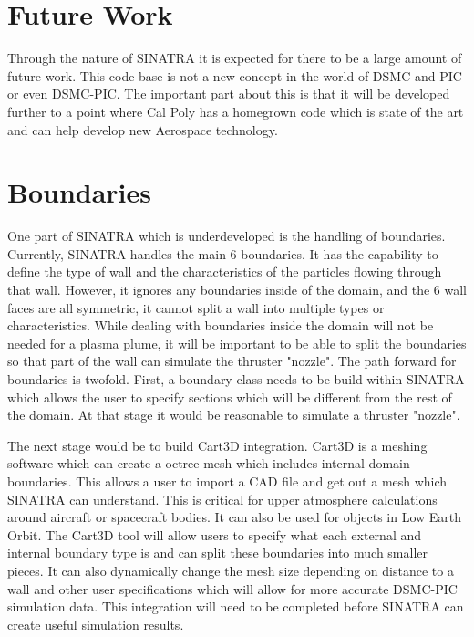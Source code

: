 \section{Future Work}

Through the nature of SINATRA it is expected for there to be a large amount of future work. This code base is not a new concept in the world of DSMC and PIC or even DSMC-PIC. The important part about this is that it will be developed further to a point where Cal Poly has a homegrown code which is state of the art and can help develop new Aerospace technology. 

\section{Boundaries}

One part of SINATRA which is underdeveloped is the handling of boundaries. Currently, SINATRA handles the main 6 boundaries. It has the capability to define the type of wall and the characteristics of the particles flowing through that wall. However, it ignores any boundaries inside of the domain, and the 6 wall faces are all symmetric, it cannot split a wall into multiple types or characteristics. While dealing with boundaries inside the domain will not be needed for a plasma plume, it will be important to be able to split the boundaries so that part of the wall can simulate the thruster "nozzle". The path forward for boundaries is twofold. First, a boundary class needs to be build within SINATRA which allows the user to specify sections which will be different from the rest of the domain. At that stage it would be reasonable to simulate a thruster "nozzle". \par

\indent The next stage would be to build Cart3D integration. Cart3D is a meshing software which can create a octree mesh which includes internal domain boundaries. This allows a user to import a CAD file and get out a mesh which SINATRA can understand. This is critical for upper atmosphere calculations around aircraft or spacecraft bodies. It can also be used for objects in Low Earth Orbit. The Cart3D tool will allow users to specify what each external and internal boundary type is and can split these boundaries into much smaller pieces. It can also dynamically change the mesh size depending on distance to a wall and other user specifications which will allow for more accurate DSMC-PIC simulation data. This integration will need to be completed before SINATRA can create useful simulation results. \par


